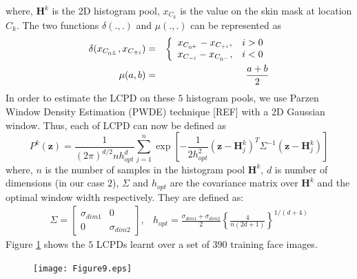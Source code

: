 \documentclass[times, 10pt,twocolumn]{article}
\begin{document}
where, $\mathbf{H}^k$ is the 2D histogram pool, $x_{C_k}$ is the
value on the skin mask at location $C_k$. The two functions
$\delta(.,.)$ and $\mu(.,.)$ can be represented as
\begin{eqnarray}
\delta(x_{C_{0^{\pm}}}, x_{C_{\pm i}}) & = & \left\{
\begin{array}{l l}
x_{C_{0^+}} - x_{C_{+i}}, & i>0 \\
x_{C_{-i}} - x_{C_{0^-}}, & i<0 \\
\end{array}
\right. \\
\mu(a,b) & = & \frac{a+b}{2}
\end{eqnarray}
In order to estimate the LCPD on these $5$ histogram pools, we use
Parzen Window Density Estimation (PWDE) technique [REF] with a 2D
Gaussian window. Thus, each of LCPD can now be defined as
\begin{equation}
P^k(\mathbf z) = \frac{1}{(2\pi)^{d/2} n
h_{opt}^d}\sum\limits_{j=1}^n \exp \left[-\frac{1}{2 h^2_{opt}}
\left(\mathbf{z} - \mathbf {H}^k_j\right)^T \Sigma^{-1} \left(
\mathbf{z} - \mathbf {H}^k_j\right) \right]
\end{equation}
where, $n$ is the number of samples in the histogram pool
$\mathbf{H}^k$, $d$ is number of dimensions (in our case $2$),
$\Sigma$ and $h_{opt}$ are the covariance matrix over $\mathbf{H}^k$
and the optimal window width respectively. They are defined as:
\begin{eqnarray}
\Sigma = \left[\begin{array}{cc} \sigma_{dim1} & 0 \\ 0 &
\sigma_{dim2}\end{array} \right], & h_{opt} =
\frac{\sigma_{dim1}+\sigma_{dim2}}{2} \left\{\frac{4}{n(2d+1)}
\right\}^{1/(d+4)}          \nonumber
\end{eqnarray}
Figure \ref{Fig:LCPDs} shows the $5$ LCPDs learnt over a set of
$390$ training face images.
\begin{figure}[h]
\hspace{-0.3in}\texttt{[image: Figure9.eps]}
\caption{{\bf {\selectfont }}} \label{Fig:LCPDs}
\end{figure}
\end{document}
